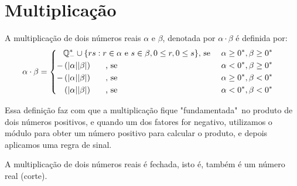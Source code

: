 \documentclass[../main.tex]{subfiles}
\begin{document}
\section{Multiplicação}
\begin{defi}\label{reais-def-multiplicacao}
    A multiplicação de dois números reais $\alpha$ e $\beta$, denotada por $\alpha \cdot \beta$ é definida por:
    \begin{equation}
         \alpha \cdot \beta = 
        \begin{cases}
        \begin{aligned}
            & \mathbb{Q}^*_{-} \cup \{ rs : r \in \alpha \text{ e } s \in \beta, 0 \leq r, 0 \leq s \} \text{, se } & \alpha \geq 0^*, \beta \geq 0^*  \\
            - & \left(\abs{\alpha}\abs{\beta}\right) \hspace{0.6cm} \text{, se } & \alpha < 0^*, \beta \geq 0^* \\
            - & \left(\abs{\alpha}\abs{\beta}\right) \hspace{0.6cm} \text{, se } & \alpha \geq 0^*, \beta < 0^* \\
              & \left(\abs{\alpha}\abs{\beta}\right) \hspace{0.6cm} \text{, se } & \alpha < 0^*, \beta < 0^*
        \end{aligned}
        \end{cases}
    \end{equation}
\end{defi}
Essa definição faz com que a multiplicação fique "fundamentada"\ no produto de dois números positivos, e quando um dos fatores for negativo, utilizamos o módulo para obter um número positivo para calcular o produto, e depois aplicamos uma regra de sinal.

\begin{prop}
    A multiplicação de dois números reais é fechada, isto é, também é um número real (corte).
\end{prop}
\end{document}
